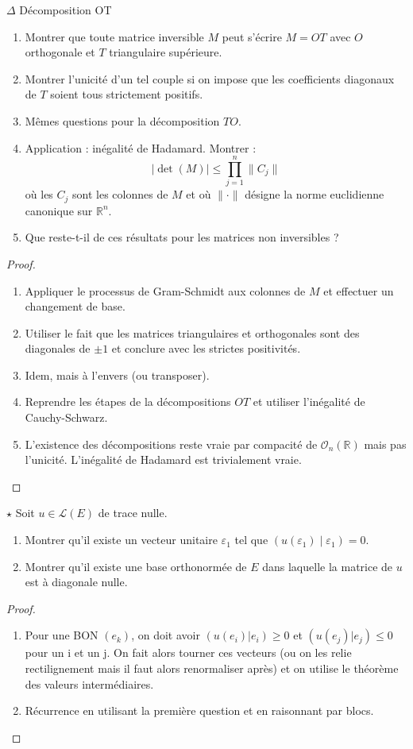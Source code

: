\documentclass[french,a4paper]{article}
\newcommand{\R}{\mathbb{R}}
\theoremstyle{plain}
\theoremstyle{definition}
\theoremstyle{remark}
\begin{document}
\begin{ex}{$\Delta$ Décomposition OT}
	\begin{enumerate}
		\item Montrer que toute matrice inversible $M$ peut s'écrire $M=OT$ avec $O$ orthogonale et $T$ triangulaire supérieure.
		\item Montrer l'unicité d'un tel couple si on impose que les coefficients diagonaux de $T$ soient tous strictement positifs.
		\item Mêmes questions pour la décomposition $TO$.
		\item Application : inégalité de Hadamard. Montrer : $$\lvert\det(M)\rvert\leqslant\prod_{j=1}^{n}\lVert C_j\rVert$$ où les $C_j$ sont les colonnes de $M$ et où $\lVert\cdot\rVert$ désigne la norme euclidienne canonique sur $\R^n$.
		\item Que reste-t-il de ces résultats pour les matrices non inversibles ?
	\end{enumerate}
\end{ex}
\begin{proof}
	\begin{enumerate}
		\item Appliquer le processus de Gram-Schmidt aux colonnes de $M$ et effectuer un changement de base.
		\item Utiliser le fait que les matrices triangulaires et orthogonales sont des diagonales de $\pm 1$ et conclure avec les strictes positivités.
		\item Idem, mais à l'envers (ou transposer).
		\item Reprendre les étapes de la décompositions $OT$ et utiliser l'inégalité de Cauchy-Schwarz.
		\item L'existence des décompositions reste vraie par compacité de $\mathcal{O}_n(\R)$ mais pas l'unicité. L'inégalité de Hadamard est trivialement vraie.
	\end{enumerate}
\end{proof}

\begin{ex}{$\star$}
	Soit $u\in\mathcal{L}(E)$ de trace nulle.
	\begin{enumerate}
		\item Montrer qu'il existe un vecteur unitaire $\varepsilon_1$ tel que $(u(\varepsilon_1)\mid\varepsilon_1)=0$.
		\item Montrer qu'il existe une base orthonormée de $E$ dans laquelle la matrice de $u$ est à diagonale nulle.
	\end{enumerate}
\end{ex}
\begin{proof}
	\begin{enumerate}
		\item Pour une BON $(e_k)$, on doit avoir $(u(e_i)|e_i)\geqslant0$ et $(u(e_j)|e_j)\leqslant0$ pour un i et un j. On fait alors tourner ces vecteurs (ou on les relie rectilignement mais il faut alors renormaliser après) et on utilise le théorème des valeurs intermédiaires.
		\item Récurrence en utilisant la première question et en raisonnant par blocs.
	\end{enumerate}
\end{proof}
\end{document}
